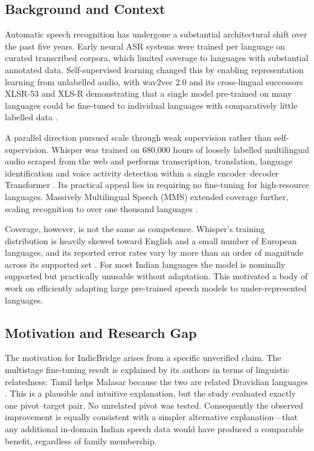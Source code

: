 \documentclass[conference]{IEEEtran}
\begin{document}
\subsection{Background and Context}

Automatic speech recognition has undergone a substantial architectural
shift over the past five years. Early neural ASR systems were trained
per language on curated transcribed corpora, which limited coverage to
languages with substantial annotated data. Self-supervised learning
changed this by enabling representation learning from unlabelled audio,
with wav2vec 2.0 and its cross-lingual successors XLSR-53 and XLS-R
demonstrating that a single model pre-trained on many languages could be
fine-tuned to individual languages with comparatively little labelled
data \cite{conneau2021xlsr, babu2022xlsr}.

A parallel direction pursued scale through weak supervision rather than
self-supervision. Whisper was trained on 680{,}000 hours of loosely
labelled multilingual audio scraped from the web and performs
transcription, translation, language identification and voice activity
detection within a single encoder--decoder Transformer \cite{radford2023whisper}.
Its practical appeal lies in requiring no fine-tuning for
high-resource languages. Massively Multilingual Speech (MMS) extended
coverage further, scaling recognition to over one thousand languages
\cite{pratap2024mms}.

Coverage, however, is not the same as competence. Whisper's training
distribution is heavily skewed toward English and a small number of
European languages, and its reported error rates vary by more than an
order of magnitude across its supported set \cite{radford2023whisper}.
For most Indian languages the model is nominally supported but
practically unusable without adaptation. This motivated a body of work
on efficiently adapting large pre-trained speech models to
under-represented languages.

\subsection{Motivation and Research Gap}

The motivation for IndicBridge arises from a specific unverified claim.
The multistage fine-tuning result is explained by its authors in terms
of linguistic relatedness: Tamil helps Malasar because the two are
related Dravidian languages \cite{pillai2024multistage}. This is a
plausible and intuitive explanation, but the study evaluated exactly one
pivot--target pair. No unrelated pivot was tested. Consequently the
observed improvement is equally consistent with a simpler alternative
explanation---that any additional in-domain Indian speech data
would have produced a comparable benefit, regardless of family
membership.
\end{document}
